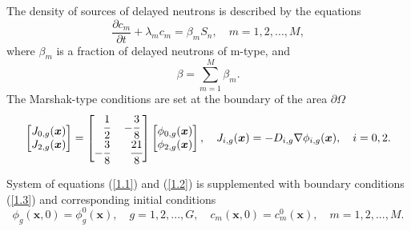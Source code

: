 \documentclass[authoryear]{elsarticle}
\begin{document}
The density of sources of delayed neutrons is described by the equations
\begin{equation}\label{1.2}
 \frac{\partial c_m}{\partial t} + \lambda_m c_m = \beta_m S_{n},
 \quad m = 1,2, ..., M, 
\end{equation}
where $\beta_m$ is a fraction of delayed neutrons of m-type, and
\[
 \beta = \sum_{m=1}^{M} \beta_m.
\] 
The Marshak-type conditions are set at the boundary of the area $\partial \Omega$
\begin{equation}\label{1.3}
\begin{split}
\begin{bmatrix}
J_{0,g}(\bm x)\\
J_{2,g}(\bm x)\\
\end{bmatrix}
=
\begin{bmatrix}
\phantom{-}\cfrac{1}{2} & -\cfrac{3}{8} \\
 -\cfrac{3}{8} & \phantom{-}\cfrac{21}{8} \\
\end{bmatrix}
\begin{bmatrix}
\phi_{0,g}(\bm x) \\
\phi_{2,g}(\bm x) \\
\end{bmatrix},
\quad
J_{i,g}(\bm x) = -D_{i,g}\nabla\phi_{i,g}(\bm x), 
\quad
i = 0, 2.
\end{split}
\end{equation}

System of equations (\ref{1.1}) and (\ref{1.2}) is supplemented with boundary conditions (\ref{1.3}) and corresponding initial conditions
\begin{equation}\label{1.4}
 \phi_g(\bm x,0) = \phi_g^0(\bm x), 
 \quad g = 1,2, ..., G,
 \quad c_m(\bm x,0) = c_m^0(\bm x), 
 \quad m = 1,2, ..., M.
\end{equation}
\end{document}
